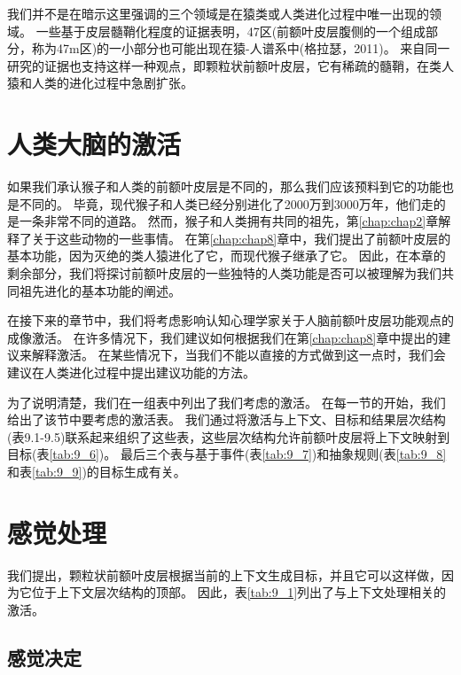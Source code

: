 我们并不是在暗示这里强调的三个领域是在猿类或人类进化过程中唯一出现的领域。
一些基于皮层髓鞘化程度的证据表明，47区(前额叶皮层腹侧的一个组成部分，称为47m区)的一小部分也可能出现在猿-人谱系中(格拉瑟，2011)。
来自同一研究的证据也支持这样一种观点，即颗粒状前额叶皮层，它有稀疏的髓鞘，在类人猿和人类的进化过程中急剧扩张。



\section{人类大脑的激活}
\par
如果我们承认猴子和人类的前额叶皮层是不同的，那么我们应该预料到它的功能也是不同的。
毕竟，现代猴子和人类已经分别进化了2000万到3000万年，他们走的是一条非常不同的道路。
然而，猴子和人类拥有共同的祖先，第\ref{chap:chap2}章解释了关于这些动物的一些事情。
在第\ref{chap:chap8}章中，我们提出了前额叶皮层的基本功能，因为灭绝的类人猿进化了它，而现代猴子继承了它。
因此，在本章的剩余部分，我们将探讨前额叶皮层的一些独特的人类功能是否可以被理解为我们共同祖先进化的基本功能的阐述。
\par


在接下来的章节中，我们将考虑影响认知心理学家关于人脑前额叶皮层功能观点的成像激活。
在许多情况下，我们建议如何根据我们在第\ref{chap:chap8}章中提出的建议来解释激活。
在某些情况下，当我们不能以直接的方式做到这一点时，我们会建议在人类进化过程中提出建议功能的方法。
\par


为了说明清楚，我们在一组表中列出了我们考虑的激活。
在每一节的开始，我们给出了该节中要考虑的激活表。
我们通过将激活与上下文、目标和结果层次结构(表9.1-9.5)联系起来组织了这些表，这些层次结构允许前额叶皮层将上下文映射到目标(表\ref{tab:9_6})。
最后三个表与基于事件(表\ref{tab:9_7})和抽象规则(表\ref{tab:9_8}和表\ref{tab:9_9})的目标生成有关。



\section{感觉处理}

我们提出，颗粒状前额叶皮层根据当前的上下文生成目标，并且它可以这样做，因为它位于上下文层次结构的顶部。
因此，表\ref{tab:9_1}列出了与上下文处理相关的激活。



\subsection{感觉决定}
\par


